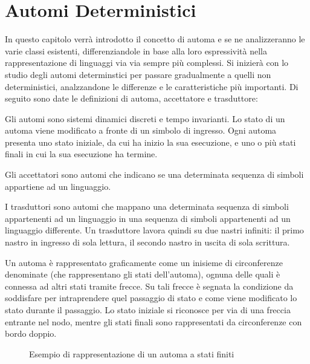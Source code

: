 \chapter{Automi Deterministici}
  In questo capitolo verrà introdotto il concetto di automa e se ne analizzeranno le varie classi esistenti, differenziandole in base alla loro espressività nella rappresentazione di linguaggi via via sempre più complessi. Si inizierà con lo studio degli automi determinstici per passare gradualmente a quelli non deterministici, analzzandone le differenze e le caratteristiche più importanti. Di seguito sono date le definizioni di automa, accettatore e trasduttore:

  \begin{definition}
    Gli automi sono sistemi dinamici discreti e tempo invarianti. Lo stato di un automa viene modificato a fronte di un simbolo di ingresso. Ogni automa presenta uno stato iniziale, da cui ha inizio la sua esecuzione, e uno o più stati finali in cui la sua esecuzione ha termine. 
  \end{definition}

  \begin{definition}
    Gli accettatori sono automi che indicano se una determinata sequenza di simboli appartiene ad un linguaggio.    
  \end{definition}

  \begin{definition}
    I trasduttori sono automi che mappano una determinata sequenza di simboli appartenenti ad un linguaggio in una sequenza di simboli appartenenti ad un linguaggio differente. Un trasduttore lavora quindi su due nastri infiniti:
    il primo nastro in ingresso di sola lettura, il secondo nastro in uscita di sola scrittura. 
  \end{definition}

  Un automa è rappresentato graficamente come un inisieme di circonferenze denominate (che rappresentano gli stati dell'automa), ognuna delle quali è connessa ad altri stati tramite frecce. Su tali frecce è segnata la condizione da soddisfare per intraprendere quel passaggio di stato e come viene modificato lo stato durante il passaggio. Lo stato iniziale si riconosce per via di una freccia entrante nel nodo, mentre gli stati finali sono rappresentati da circonferenze con bordo doppio. 

  \begin{figure}[h!]
    \begin{center}
    \end{center}
    \caption{Esempio di rappresentazione di un automa a stati finiti}
  \end{figure}

